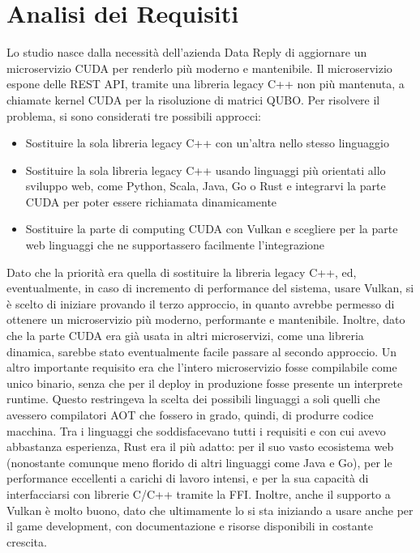 \chapter{Analisi dei Requisiti}
\label{sec:requirements}


Lo studio nasce dalla necessità dell'azienda Data Reply di aggiornare un microservizio CUDA per renderlo più moderno e mantenibile. Il microservizio espone delle REST API, tramite una libreria legacy C++ non più mantenuta, a chiamate kernel CUDA per la risoluzione di matrici QUBO. Per risolvere il problema, si sono considerati tre possibili approcci:

\begin{itemize}
    \item Sostituire la sola libreria legacy C++ con un'altra nello stesso linguaggio
    \item Sostituire la sola libreria legacy C++ usando linguaggi più orientati allo sviluppo web, come Python, Scala, Java, Go o Rust e integrarvi la parte CUDA per poter essere richiamata dinamicamente
    \item Sostituire la parte di computing CUDA con Vulkan e scegliere per la parte web linguaggi che ne supportassero facilmente l'integrazione 
\end{itemize}

Dato che la priorità era quella di sostituire la libreria legacy C++, ed, eventualmente, in caso di incremento di performance del sistema, usare Vulkan, si è scelto di iniziare provando il terzo approccio, in quanto avrebbe permesso di ottenere un microservizio più moderno, performante e mantenibile. Inoltre, dato che la parte CUDA era già usata in altri microservizi, come una libreria dinamica, sarebbe stato eventualmente facile passare al secondo approccio. Un altro importante requisito era che l'intero microservizio fosse compilabile come unico binario, senza che per il deploy in produzione fosse presente un interprete runtime. Questo restringeva la scelta dei possibili linguaggi a soli quelli che avessero compilatori \gls{AOT} che fossero in grado, quindi, di produrre codice macchina. Tra i linguaggi che soddisfacevano tutti i requisiti e con cui avevo abbastanza esperienza, Rust era il più adatto: per il suo vasto ecosistema web (nonostante comunque meno florido di altri linguaggi come Java e Go), per le performance eccellenti a carichi di lavoro intensi, e per la sua capacità di interfacciarsi con librerie C/C++ tramite la FFI. Inoltre, anche il supporto a Vulkan è molto buono, dato che ultimamente lo si sta iniziando a usare anche per il game development, con documentazione e risorse disponibili in costante crescita.

